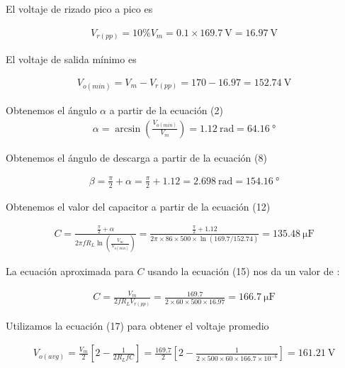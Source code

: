 \documentclass{article}
\begin{document}
\noindent El voltaje de rizado pico a pico es

\begin{align}
	V_{r(pp)} = 10\% V_m = 0.1 \times \qty{169.7}{\volt} = \qty{16.97}{\volt} \nonumber
\end{align}

\noindent El voltaje de salida mínimo es

\begin{align}
	V_{o(min)} = V_m  - V_{r(pp)} = 170 - 16.97 = \qty{152.74}{\volt} \nonumber
\end{align}

\noindent Obtenemos el ángulo $\alpha$ a partir de la ecuación (2)
\begin{align}
	\alpha = \arcsin \left( \frac{V_{o(min)}}{V_m} \right) = \qty{1.12}{\radian} = \qty{64.16}{\degree} \nonumber
\end{align}

\noindent Obtenemos el ángulo de descarga a partir de la ecuación (8)

\begin{align}
	\beta = \frac{\pi}{2} + \alpha = \frac{\pi}{2} + 1.12 = \qty{2.698}{\radian} = \qty{154.16}{\degree} \nonumber
\end{align}

\noindent Obtenemos el valor del capacitor a partir de la ecuación (12)

\begin{align}
	C = \frac{ \frac{\pi}{2}  + \alpha }{ 2\pi f R_L \ln \left( \frac{V_m}{V_{o(min)}} \right) } = \frac{ \frac{\pi}{2} + 1.12 }{2\pi \times 86 \times 500 \times \ln (169.7 / 152.74)} = \qty{135.48}{\micro \farad} \nonumber
\end{align}

\noindent La ecuación aproximada para $C$ usando la ecuación (15) nos da un valor de :

\begin{align}
	C = \frac{V_m}{2fR_L V_{r(pp)}} = \frac{169.7}{2 \times 60 \times 500 \times 16.97} = \qty{166.7}{\micro \farad} \nonumber
\end{align}

\noindent Utilizamos la ecuación (17) para obtener el voltaje promedio

\begin{align}
	V_{o(avg)} = \frac{V_m}{2} \left[ 2 - \frac{1}{2R_L f C} \right] = \frac{169.7}{2} \left[ 2 - \frac{1}{2 \times 500 \times 60 \times 166.7 \times 10^{-6}} \right] = \qty{161.21}{\volt} \nonumber
\end{align}
\end{document}
